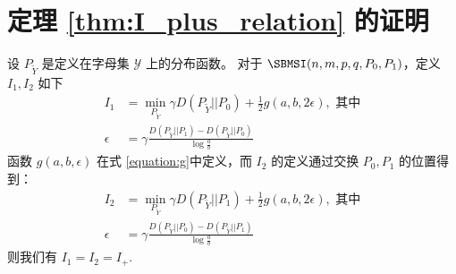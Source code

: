 \section{定理 \ref{thm:I_plus_relation} 的证明}
	\begin{lemma}\label{lem:p0p12}
        设 $P_{\widetilde{Y}}$ 是定义在字母集
        $\mathcal{Y}$ 上的分布函数。
		对于 $\SBMSI(n,m,p,q,P_0,P_1)$，定义
        $I_1, I_2$ 如下
		\begin{align}
			I_1 &=\min_{P_{\widetilde{Y}}} \gamma D(P_{\widetilde{Y}}|| P_0)+ \frac{1}{2} g(a,b, 2\epsilon),
            \text{ 其中}\nonumber\\
			\epsilon &= \gamma \frac{D(P_{\widetilde{Y}} || P_1) - D(P_{\widetilde{Y}} || P_0) }{\log \frac{a}{b}}\label{eq:I1}
		\end{align}
        函数 $g(a,b,\epsilon)$ 在式 \eqref{equation:g}中定义，而 $I_2$ 的定义通过交换 $P_0, P_1$ 的位置得到：
		\begin{align}
			I_2 & = \min_{P_{\widetilde{Y}}} \gamma D(P_{\widetilde{Y}}|| P_1)+ \frac{1}{2} g(a,b, 2\epsilon),
            \text{ 其中}\nonumber\\
			\epsilon &= \gamma \frac{D(P_{\widetilde{Y}} || P_0) - D(P_{\widetilde{Y}} || P_1) }{\log \frac{a}{b}}
            \label{eq:I2}
		\end{align}
 		则我们有 $I_1=I_2=I_+$. 
    \end{lemma}
